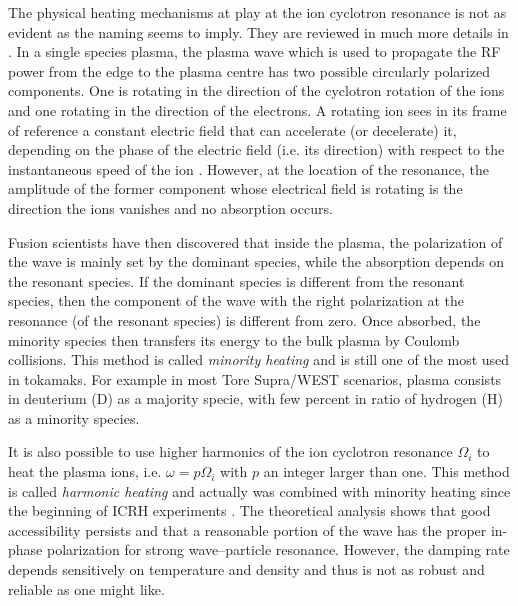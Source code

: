 
The physical heating mechanisms at play at the ion cyclotron resonance is not as evident as the naming seems to imply. They are reviewed in much more details in . In a single species plasma, the plasma wave which is used to propagate the RF power from the edge to the plasma centre has two possible circularly polarized components. One is rotating in the direction of the cyclotron rotation of the ions and one rotating in the direction of the electrons. A rotating ion sees in its frame of reference a constant electric field that can accelerate (or decelerate) it, depending on the phase of the electric field (i.e. its direction) with respect to the instantaneous speed of the ion . However, at the location of the resonance, the amplitude of the former component whose electrical field is rotating is the direction the ions vanishes and no absorption occurs. 

Fusion scientists have then discovered that inside the plasma, the polarization of the wave is mainly set by the dominant species, while the absorption depends on the resonant species. If the dominant species is different from the resonant species, then the component of the wave with the right polarization at the resonance (of the resonant species) is different from zero. Once absorbed, the minority species then transfers its energy to the bulk plasma by Coulomb collisions. This method is called \textit{minority heating} and is still one of the most used in tokamaks. For example in most Tore Supra/WEST scenarios, plasma consists in deuterium (D) as a majority specie, with few percent in ratio of hydrogen (H) as a minority species. 

It is also possible to use higher harmonics of the ion cyclotron resonance $\Omega_i$ to heat the plasma ions, i.e. $\omega = p \Omega_{i}$ with $p$ an integer larger than one. This method is called \textit{harmonic heating} and actually was combined with minority heating since the beginning of ICRH experiments . The theoretical analysis shows that good accessibility persists and that a reasonable portion of the wave has the proper in-phase polarization for strong wave–particle resonance. However, the damping rate depends sensitively on temperature and density and thus is not as robust and reliable as one might like\cite{Freidberg2007}. 

